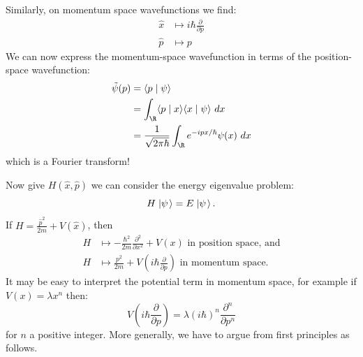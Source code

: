\documentclass[../Main.tex]{subfiles}
\begin{document}
Similarly, on momentum space wavefunctions we find:
\begin{align*}
    \hat{x} &\mapsto i\hbar \frac{\partial}{\partial p} \\
    \hat{p} &\mapsto p
\end{align*}
We can now express the momentum-space wavefunction in terms of the position-space wavefunction:
\begin{align*}
    \tilde{\psi}(p) &= \inn{p}{\psi} \\
    &= \int_{\R} \inn{p}{x} \inn{x}{\psi}~dx \\
    &= \frac{1}{\sqrt{2\pi\hbar}} \int_{\R} e^{-ipx/\hbar} \psi(x)~dx
\end{align*}
which is a Fourier transform!

Now give $H(\hat{x}, \hat{p})$ we can consider the energy eigenvalue problem:
\begin{equation*}
    H\left.\left|\psi\right.\right\rangle = E\left.\left|\psi\right.\right\rangle.
\end{equation*}
If $H = \frac{\hat{p}^2}{2m} + V(\hat{x})$, then
\begin{align*}
    H &\mapsto -\frac{\hbar^2}{2m} \frac{\partial^{2}}{\partial x^{2}} + V(x) \text{ in position space, and} \\
    H&\mapsto \frac{p^2}{2m} + V\left(i\hbar \frac{\partial}{\partial p}\right) \text{ in momentum space.}
\end{align*}
It may be easy to interpret the potential term in momentum space, for example if $V(x) = \lambda x^n$ then:
\begin{equation*}
    V\left(i\hbar \frac{\partial }{\partial p}\right) = \lambda (i\hbar)^n \frac{\partial^{n}}{\partial p^{n}}
\end{equation*}
for $n$ a positive integer. More generally, we have to argue from first principles as follows.
\end{document}

